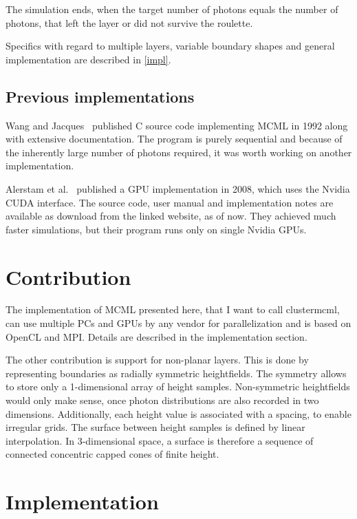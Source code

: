 \documentclass[]{article}
\begin{document}
The simulation ends, when the target number of photons equals the number of photons, that left the layer or did not survive the roulette.

Specifics with regard to multiple layers, variable boundary shapes and general implementation are described in \autoref{impl}.

\subsection{Previous implementations}

Wang and Jacques~\cite{wang1992monte} published C source code implementing MCML in 1992 along with extensive documentation. The program is purely sequential and because of the inherently large number of photons required, it was worth working on another implementation.

Alerstam et al.~\cite{alerstam2008parallel} published a GPU implementation in 2008, which uses the Nvidia CUDA interface. The source code, user manual and implementation notes are available as download from the linked website, as of now. They achieved much faster simulations, but their program runs only on single Nvidia GPUs.

\section{Contribution}

The implementation of MCML presented here, that I want to call clustermcml, can use multiple PCs and GPUs by any vendor for parallelization and is based on OpenCL and MPI. Details are described in the implementation section.

The other contribution is support for non-planar layers. This is done by representing boundaries as radially symmetric heightfields. The symmetry allows to store only a 1-dimensional array of height samples. Non-symmetric heightfields would only make sense, once photon distributions are also recorded in two dimensions. Additionally, each height value is associated with a spacing, to enable irregular grids. The surface between height samples is defined by linear interpolation. In 3-dimensional space, a surface is therefore a sequence of connected concentric capped cones of finite height.

\section{Implementation}
\label{impl}
\end{document}
